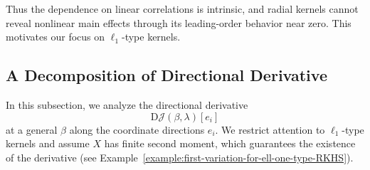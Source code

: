 \documentclass[sn-mathphys-num]{sn-jnl}%
\numberwithin{equation}{section}
\newcommand{\E}{\mathbb{E}}
\newtheorem{assumption}{Assumption}[section]
\theoremstyle{thmstyleone}%
\theoremstyle{thmstyletwo}%
\theoremstyle{thmstylethree}%
\begin{document}
Thus the dependence on linear correlations is intrinsic, and radial kernels cannot reveal nonlinear main effects through its leading-order behavior near zero. This motivates our focus on $\ell_1$-type kernels.

%
%
%
%
%
%


\subsection{A Decomposition of Directional Derivative} 
\label{sec:decomposition-of-derivative}
In this subsection, we analyze the directional derivative
\begin{equation*}
	\mathrm{D}\mathcal{J}(\beta, \lambda)[e_i]
\end{equation*} 
at a general $\beta$ along the coordinate directions $e_i$. We restrict attention to $\ell_1$-type kernels and assume $X$ has finite second moment, which guarantees the existence of the derivative (see Example~\ref{example:first-variation-for-ell-one-type-RKHS}).
\end{document}
